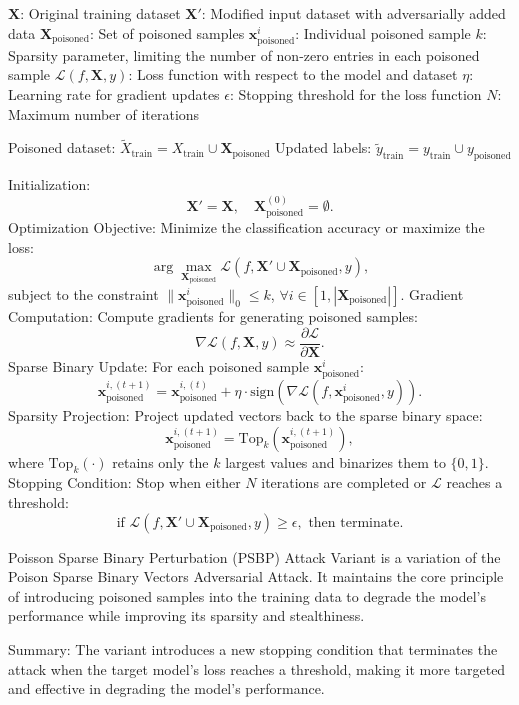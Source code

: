 $\mathbf{X}$: Original training dataset  
$\mathbf{X}'$: Modified input dataset with adversarially added data  
$\mathbf{X}_{\text{poisoned}}$: Set of poisoned samples  
$\mathbf{x}_{\text{poisoned}}^i$: Individual poisoned sample  
$k$: Sparsity parameter, limiting the number of non-zero entries in each poisoned sample  
$\mathcal{L}(f, \mathbf{X}, y)$: Loss function with respect to the model and dataset  
$\eta$: Learning rate for gradient updates  
$\epsilon$: Stopping threshold for the loss function  
$N$: Maximum number of iterations  

Poisoned dataset: $\tilde{X}_{\text{train}} = X_{\text{train}} \cup \mathbf{X}_{\text{poisoned}}$  
Updated labels: $\tilde{y}_{\text{train}} = y_{\text{train}} \cup y_{\text{poisoned}}$  

Initialization:
\[
\mathbf{X}' = \mathbf{X}, \quad \mathbf{X}_{\text{poisoned}}^{(0)} = \emptyset.
\]
Optimization Objective: Minimize the classification accuracy or maximize the loss:
\[
\arg \max_{\mathbf{X}_{\text{poisoned}}} \mathcal{L}(f, \mathbf{X}' \cup \mathbf{X}_{\text{poisoned}}, y),
\]
subject to the constraint $\|\mathbf{x}_{\text{poisoned}}^i\|_0 \leq k$, $\forall i \in [1, |\mathbf{X}_{\text{poisoned}}|]$.
Gradient Computation: Compute gradients for generating poisoned samples:
\[
\nabla \mathcal{L}(f, \mathbf{X}, y) \approx \frac{\partial \mathcal{L}}{\partial \mathbf{X}}.
\]
Sparse Binary Update: For each poisoned sample $\mathbf{x}_{\text{poisoned}}^i$:
\[
\mathbf{x}_{\text{poisoned}}^{i,(t+1)} = \mathbf{x}_{\text{poisoned}}^{i,(t)} + \eta \cdot \text{sign}\left(\nabla \mathcal{L}(f, \mathbf{x}_{\text{poisoned}}^i, y)\right).
\]
Sparsity Projection: Project updated vectors back to the sparse binary space:
\[
\mathbf{x}_{\text{poisoned}}^{i,(t+1)} = \text{Top}_k\left(\mathbf{x}_{\text{poisoned}}^{i,(t+1)}\right),
\]
where $\text{Top}_k(\cdot)$ retains only the $k$ largest values and binarizes them to $\{0,1\}$.
Stopping Condition: Stop when either $N$ iterations are completed or $\mathcal{L}$ reaches a threshold:
\[
\text{if } \mathcal{L}(f, \mathbf{X}' \cup \mathbf{X}_{\text{poisoned}}, y) \geq \epsilon, \text{ then terminate.}
\]

Poisson Sparse Binary Perturbation (PSBP) Attack Variant is a variation of the Poison Sparse Binary Vectors Adversarial Attack. It maintains the core principle of introducing poisoned samples into the training data to degrade the model's performance while improving its sparsity and stealthiness.

Summary: The variant introduces a new stopping condition that terminates the attack when the target model's loss reaches a threshold, making it more targeted and effective in degrading the model's performance.